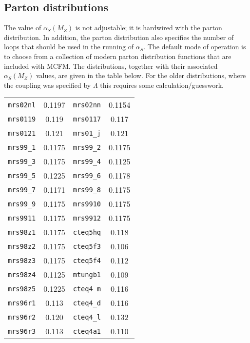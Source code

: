 \documentclass[12pt]{article}
\begin{document}
\subsection{Parton distributions}
The value of $\alpha_S(M_Z)$ is not adjustable; it is hardwired with the
parton distribution. In addition, the parton distribution also specifies
the number of loops that should be used in the running of $\alpha_S$.
The default mode of operation is to choose from a
collection of modern parton distribution functions that are included with
MCFM.  The distributions, together with their associated $\alpha_S(M_Z)$
values, are given in the table below. For the older distributions, where the
coupling was specified by $\Lambda$ this requires some calculation/guesswork.
\begin{table}[h]
\begin{center}
\begin{tabular}{|c|c||c|c|}
\hline
{\tt mrs02nl}   & 0.1197       & {\tt mrs02nn}  & 0.1154  \\
{\tt mrs0119}   & 0.119        & {\tt mrs0117}  & 0.117   \\
{\tt mrs0121}   & 0.121        & {\tt mrs01\_j} & 0.121   \\
{\tt mrs99\_1}  & 0.1175       & {\tt mrs99\_2} & 0.1175  \\
{\tt mrs99\_3}  & 0.1175       & {\tt mrs99\_4} & 0.1125  \\    
{\tt mrs99\_5}  & 0.1225       & {\tt mrs99\_6} & 0.1178  \\    
{\tt mrs99\_7}  & 0.1171       & {\tt mrs99\_8} & 0.1175  \\    
{\tt mrs99\_9}  & 0.1175       & {\tt mrs9910}  & 0.1175  \\    
{\tt mrs9911}   & 0.1175       & {\tt mrs9912}  & 0.1175  \\    
{\tt mrs98z1}   &  0.1175      & {\tt cteq5hq}  &  0.118  \\
{\tt mrs98z2}   &  0.1175      & {\tt cteq5f3}  &  0.106  \\
{\tt mrs98z3}   &  0.1175      & {\tt cteq5f4}  &  0.112  \\
{\tt mrs98z4}   &  0.1125      & {\tt mtungb1}  &  0.109  \\
{\tt mrs98z5}   &  0.1225      & {\tt cteq4\_m} &  0.116  \\
{\tt mrs96r1}   &  0.113       & {\tt cteq4\_d} &  0.116  \\
{\tt mrs96r2}   &  0.120       & {\tt cteq4\_l} &  0.132  \\
{\tt mrs96r3}   &  0.113       & {\tt cteq4a1}  &  0.110  \\

\end{tabular}
\end{center}
\end{table}
\end{document}
